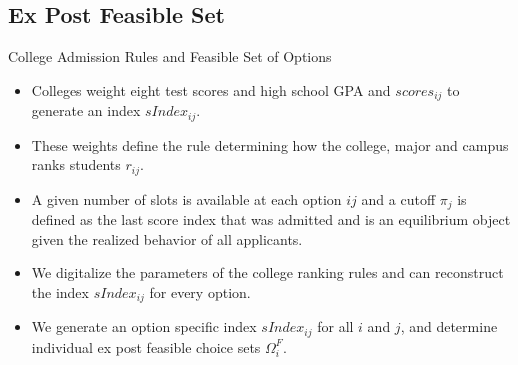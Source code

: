 \documentclass[table,10pt]{beamer}
\begin{document}
\subsection{Ex Post Feasible Set}

\begin{frame}{College Admission Rules and Feasible Set of Options}
\begin{itemize}

\item<1> Colleges weight eight test scores and high school GPA and $scores_{ij}$ to generate an \alert{index $sIndex_{ij}$}.
\medskip

\item<2> These weights define the rule determining how the college, major and campus \alert{ranks students $r_{ij}$}.
\medskip

\item<3> A given number of slots is available at each option $ij$ and a \alert{cutoff  $\pi_j$} is defined as the last score index that was admitted and is  an equilibrium object given the realized behavior of all applicants. \smallskip
\medskip

\item<4> We digitalize the parameters of the \alert{college ranking rules} and can reconstruct the index $sIndex_{ij}$ for every option.
\medskip

\item<5> We generate an option specific index $sIndex_{ij}$ for all $i$ and $j$, and determine \alert{individual ex post feasible choice sets $\Omega_i^F$}.

\end{itemize}
\end{frame}
\end{document}
